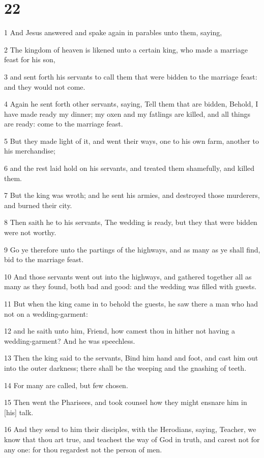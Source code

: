 \chapter{22}

\par 1 And Jesus answered and spake again in parables unto them, saying,
\par 2 The kingdom of heaven is likened unto a certain king, who made a marriage feast for his son,
\par 3 and sent forth his servants to call them that were bidden to the marriage feast: and they would not come.
\par 4 Again he sent forth other servants, saying, Tell them that are bidden, Behold, I have made ready my dinner; my oxen and my fatlings are killed, and all things are ready: come to the marriage feast.
\par 5 But they made light of it, and went their ways, one to his own farm, another to his merchandise;
\par 6 and the rest laid hold on his servants, and treated them shamefully, and killed them.
\par 7 But the king was wroth; and he sent his armies, and destroyed those murderers, and burned their city.
\par 8 Then saith he to his servants, The wedding is ready, but they that were bidden were not worthy.
\par 9 Go ye therefore unto the partings of the highways, and as many as ye shall find, bid to the marriage feast.
\par 10 And those servants went out into the highways, and gathered together all as many as they found, both bad and good: and the wedding was filled with guests.
\par 11 But when the king came in to behold the guests, he saw there a man who had not on a wedding-garment:
\par 12 and he saith unto him, Friend, how camest thou in hither not having a wedding-garment? And he was speechless.
\par 13 Then the king said to the servants, Bind him hand and foot, and cast him out into the outer darkness; there shall be the weeping and the gnashing of teeth.
\par 14 For many are called, but few chosen.
\par 15 Then went the Pharisees, and took counsel how they might ensnare him in [his] talk.
\par 16 And they send to him their disciples, with the Herodians, saying, Teacher, we know that thou art true, and teachest the way of God in truth, and carest not for any one: for thou regardest not the person of men.
